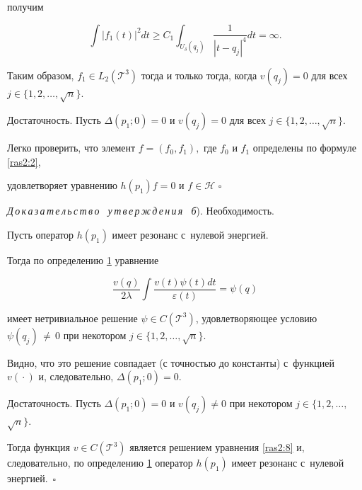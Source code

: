получим

$$

\int |f_1(t)|^2dt\geq C_1 \int_{U_\delta(q_j)} \frac{1}{|t-q_j|^4}dt=\infty.

$$



Таким образом, $f_1 \in L_2({\mathcal T}^3)$ тогда и только тогда, когда $v(q_j) = 0$ для всех $j\in \{1, 2, \dots, \sqrt{n}\}.$



Достаточность. Пусть $\Delta(p_1; 0)=0$ и $v(q_j)=0$ для всех $j\in \{1, 2, \dots, \sqrt{n}\}.$ 

Легко проверить, что элемент $f=(f_0, f_1),$ где $f_0$ и $f_1$ определены по формуле \eqref{ras2:2},

удовлетворяет уравнению $h(p_1)f=0$ и $f \in \mathcal H$ $\square$



\smallskip



\textit{Д\,о\,к\,а\,з\,а\,т\,е\,л\,ь\,с\,т\,в\,о \ у\,т\,в\,е\,р\,ж\,д\,е\,н\,и\,я \ б}). Необходимость.

Пусть оператор $h(p_{1})$ имеет резонанс с~нулевой энергией. 

Тогда по определению \hyperlink{ras2:def:1}{1} уравнение 

\begin{equation}

\frac{v(q)}{2\lambda}\int\frac{v(t)\psi(t)dt}{\varepsilon(t)}= \psi(q)

\label{ras2:8}

\end{equation}

имеет нетривиальное решение $\psi\in C({\mathcal T}^3)$, удовлетворяющее условию \mbox{$\psi(q_j)\,{\neq}\, 0$} при некотором $j\in \{1, 2, \dots, \sqrt{n}\}.$

Видно, что это решение совпадает (с точностью до константы) с~функцией $v({}\cdot{})$ и, следовательно, $\Delta(p_1; 0)=0.$



Достаточность. Пусть $\Delta(p_1; 0)=0$ и $v(q_j)\neq 0$ при некотором $j\in \{1, 2, \dots, $ $\sqrt{n}\}.$ 

Тогда функция $v \in C({\mathcal T}^3)$ является решением уравнения \eqref{ras2:8} и, следовательно, по определению \hyperlink{ras2:def:1}{1}  оператор $h(p_{1})$ имеет резонанс с~нулевой энергией.~$\square$



\smallskip



